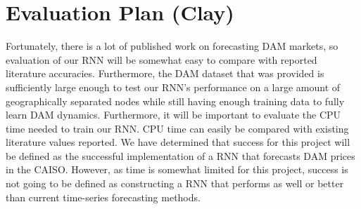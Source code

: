 \documentclass[sigconf]{acmart}
\begin{document}

\section{Evaluation Plan (Clay)}

%

Fortunately, there is a lot of published work on forecasting DAM markets, so evaluation of our RNN will be somewhat easy to compare with reported literature accuracies. Furthermore, the DAM dataset that was provided is sufficiently large enough to test our RNN's performance on a large amount of geographically separated nodes while still having enough training data to fully learn DAM dynamics. Furthermore, it will be important to evaluate the CPU time needed to train our RNN. CPU time can easily be compared with existing literature values reported. We have determined that success for this project will be defined as the successful implementation of a RNN that forecasts DAM prices in the CAISO. However, as time is somewhat limited for this project, success is not going to be defined as constructing a RNN that performs as well or better than current time-series forecasting methods.  

\end{document}
